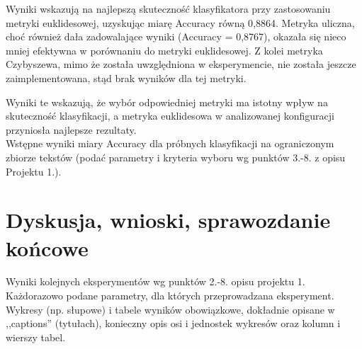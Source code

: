 \documentclass{article}
\begin{document}
Wyniki wskazują na najlepszą skuteczność klasyfikatora przy zastosowaniu metryki euklidesowej, uzyskując miarę Accuracy równą 0{,}8864. Metryka uliczna, choć również dała zadowalające wyniki (Accuracy = 0{,}8767), okazała się nieco mniej efektywna w porównaniu do metryki euklidesowej. Z kolei metryka Czybyszewa, mimo że została uwzględniona w eksperymencie, nie została jeszcze zaimplementowana, stąd brak wyników dla tej metryki.

Wyniki te wskazują, że wybór odpowiedniej metryki ma istotny wpływ na skuteczność klasyfikacji, a metryka euklidesowa w analizowanej konfiguracji przyniosła najlepsze rezultaty.\\


Wstępne wyniki miary Accuracy dla próbnych klasyfikacji na ograniczonym zbiorze tekstów (podać parametry i kryteria
wyboru wg punktów 3.-8. z opisu Projektu 1.). 


\section{Dyskusja, wnioski, sprawozdanie końcowe}

Wyniki kolejnych eksperymentów wg punktów 2.-8. opisu projektu 1.  Każdorazowo
podane parametry, dla których przeprowadzana eksperyment. 
Wykresy (np. słupowe) i tabele wyników
obowiązkowe, dokładnie opisane w ,,captions'' (tytułach), konieczny opis osi i
jednostek wykresów oraz kolumn i wierszy tabel.\\ 
\end{document}
